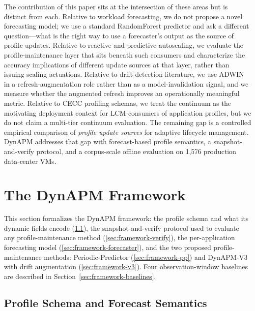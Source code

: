 \documentclass[manuscript,screen,review,anonymous]{acmart}
\begin{document}
The contribution of this paper sits at the intersection of
these areas but is distinct from each. Relative to
workload forecasting, we do not propose a novel forecasting
model; we use a standard RandomForest predictor and ask a
different question---what is the right way to use a
forecaster's output as the source of profile updates. Relative
to reactive and predictive autoscaling, we evaluate the
profile-maintenance layer that sits beneath such consumers and
characterize the accuracy implications of different update
sources at that layer, rather than issuing scaling actuations.
Relative to drift-detection literature, we use ADWIN in
a refresh-augmentation role rather than as a model-invalidation
signal, and we measure whether the augmented refresh improves
an operationally meaningful metric. Relative to CECC profiling
schemas, we treat the continuum as the motivating deployment
context for LCM consumers of application profiles, but we do
not claim a multi-tier continuum evaluation. The remaining gap
is a controlled empirical comparison of \emph{profile update
sources} for adaptive lifecycle management. DynAPM addresses
that gap with forecast-based profile semantics, a
snapshot-and-verify protocol, and a corpus-scale offline
evaluation on 1{,}576 production data-center VMs.

\section{The DynAPM Framework}\label{sec:framework}

This section formalizes the DynAPM framework: the profile schema
and what its dynamic fields encode (\ref{sec:framework-schema}),
the snapshot-and-verify protocol used to evaluate any
profile-maintenance method (\ref{sec:framework-verify}), the
per-application forecasting model (\ref{sec:framework-forecaster}),
and the two proposed profile-maintenance methods:
Periodic-Predictor (\ref{sec:framework-pp}) and DynAPM-V3 with
drift augmentation (\ref{sec:framework-v3}). Four observation-window
baselines are described in Section~\ref{sec:framework-baselines}.

\subsection{Profile Schema and Forecast Semantics}\label{sec:framework-schema}
\end{document}
